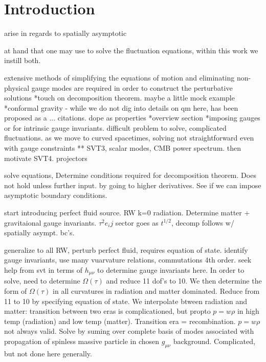 
\chapter{Introduction}
\label{c:introduction}
arise in regards to spatially asymptotic

at hand that one may use to solve the fluctuation equations, within this work we instill both. 

extensive methods of simplifying the equations of motion and eliminating non-physical gauge modes are required in order to construct the perturbative solutions
*touch on decomposition theorem. maybe a little mock example
*conformal gravity - while we do not dig into details on qm here, has been proposed as a ... citations. dope as properties
*overview section
*imposing gauges or for intrinsic gauge invariants. difficult problem to solve, complicated fluctuations. as we move to curved spacetimes, solving not straightforward even with gauge constraints
** SVT3, scalar modes, CMB power spectrum. then motivate SVT4. projectors

solve equations, Determine conditions required for decomposition theorem. Does not hold unless further input. by going to higher derivatives. See if we can impose asymptotic boundary conditions. 

start introducing perfect fluid source. RW k=0 radiation. Determine matter + gravitaional gauge invariants. $\tau^2 e_ij$ sector goes as $t^{1/2}$, decomp follows w/ spatially asympt. bc's.

generalize to all RW, perturb perfect fluid, requires equation of state. identify gauge invariants, use many vuarvature relations, commutations 4th order. seek help from svt in terms of $h_{\mu\nu}$ to determine gauge invariants here. In order to solve, need to determine $\Omega(\tau)$ and reduce 11 dof's to 10. We then determine the form of $\Omega(\tau)$ in all curvatures in radiation and matter dominated. Reduce from 11 to 10 by specifying equation of state. We interpolate btween radiation and matter: transition between two eras is complicationed, but propto $p=w\rho$ in high temp (radiation) and low temp (matter). Transition era = recombination. $p=w\rho$ not always valid. Solve by suming over complete basis of modes associated with propagation of spinless massive particle in chosen $g_{\mu\nu}$ background. Complicated, but not done here generally. 

